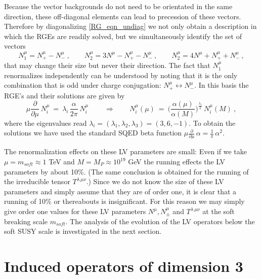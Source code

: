 \documentclass[12pt]{revtex4}
\begin{document}
Because the vector backgrounds do not need to be orientated in the
same direction, these off-diagonal elements can lead to precession of
these vectors. Therefore by diagonalizing \eqref{RG_eqn_undiag} 
we not only obtain a description in which the RGEs are readily solved,
but we simultaneously identify the set of vectors 
\begin{equation}
\label{def_Nmu} 
N_1^\mu = N_+^\mu - N_-^\mu~, 
\qquad 
N_2^\mu = 3 N^\mu - N_+^\mu - N_-^\mu~, 
\qquad 
N_2^\mu = 4 N^\mu + N_+^\mu + N_-^\mu~, 
\end{equation} 
that may change their size but never their direction. The fact that
$N_1^\mu$ renormalizes independently can be understood by noting 
that it is the only combination that is odd under charge conjugation:
 $N_+^\mu \leftrightarrow N_-^\mu$. 
In this basis the RGE's and their solutions are given by 
\begin{equation} 
\mu \frac{\partial}{\partial\mu} \, N_i^\mu 
~=~ \lambda_i\, \frac { \alpha}{2 \pi} \, N_i^\mu~ 
\qquad \Rightarrow \qquad 
N_i^\mu(\mu) ~=~ 
\Big(  \frac {\alpha(\mu)}{\alpha(M)} \Big)^{\frac {\lambda_i}2} \, 
N_i^\mu(M)~, 
\label{LV_at_soft_scale}
\end{equation} 
where the eigenvalues read 
$\lambda_i = (\lambda_1, \lambda_2, \lambda_3) = (3, 6, -1)$. 
To obtain the solutions we have used the standard SQED beta function  
\( 
\mu \frac{\partial}{\partial\mu} \, \alpha = \frac 1{\pi} \,
\alpha^2.  
\) 


The renormalization effects on these LV parameters are small: 
Even if we take $\mu = m_{soft} \approx 1$ TeV and 
$M = M_P \approx 10^{19}$ GeV the running effects the LV parameters by
about 10\%. (The same conclusion is obtained for the running of the
irreducible tensor $T^{\lambda\, \mu\nu}$.) Since we do not know the
size of these LV parameters and simply assume that they are of order
one, it is clear that a running of 10\% or thereabouts is
insignificant. For this reason we may simply give order one values for
these LV parameters $N^\mu, N_\pm^\mu$ and $T^{\lambda\, \mu\nu}$ at
the soft breaking scale $m_{soft}$. The analysis of the evolution of
the LV operators below the soft SUSY scale is investigated in the next
section. 



\section{Induced operators of dimension 3}
\label{InducedDim3}
\end{document}
